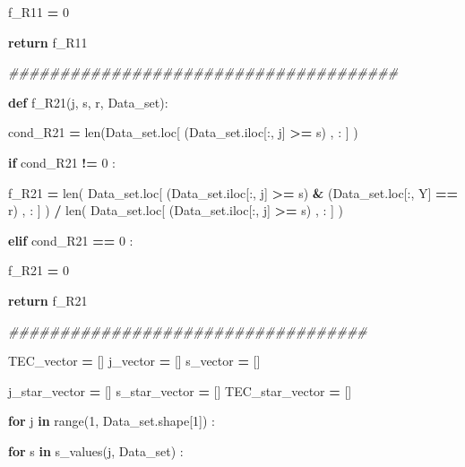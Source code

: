 \documentclass[
  11pt,
  a4paper,
]{article}
\newenvironment{Shaded}{\begin{snugshade}}{\end{snugshade}}
\newcommand{\BuiltInTok}[1]{#1}
\newcommand{\CommentTok}[1]{\textcolor[rgb]{0.56,0.35,0.01}{\textit{#1}}}
\newcommand{\ControlFlowTok}[1]{\textcolor[rgb]{0.13,0.29,0.53}{\textbf{#1}}}
\newcommand{\DecValTok}[1]{\textcolor[rgb]{0.00,0.00,0.81}{#1}}
\newcommand{\KeywordTok}[1]{\textcolor[rgb]{0.13,0.29,0.53}{\textbf{#1}}}
\newcommand{\NormalTok}[1]{#1}
\newcommand{\OperatorTok}[1]{\textcolor[rgb]{0.81,0.36,0.00}{\textbf{#1}}}
\newcommand{\StringTok}[1]{\textcolor[rgb]{0.31,0.60,0.02}{#1}}
\begin{document}
\begin{Shaded}
\begin{Highlighting}[]
\NormalTok{                f\_R11 }\OperatorTok{=} \DecValTok{0}

            
            \ControlFlowTok{return}\NormalTok{ f\_R11 }

        \CommentTok{\#\#\#\#\#\#\#\#\#\#\#\#\#\#\#\#\#\#\#\#\#\#\#\#\#\#\#\#\#\#\#\#\#\#\#\#\#\#}

        \KeywordTok{def}\NormalTok{ f\_R21(j, s, r, Data\_set):}

\NormalTok{            cond\_R21 }\OperatorTok{=} \BuiltInTok{len}\NormalTok{(Data\_set.loc[ (Data\_set.iloc[:, j] }\OperatorTok{\textgreater{}=}\NormalTok{ s) , : ] )}

            \ControlFlowTok{if}\NormalTok{ cond\_R21 }\OperatorTok{!=} \DecValTok{0}\NormalTok{ :}

\NormalTok{                f\_R21 }\OperatorTok{=} \BuiltInTok{len}\NormalTok{( Data\_set.loc[ (Data\_set.iloc[:, j] }\OperatorTok{\textgreater{}=}\NormalTok{ s) }\OperatorTok{\&}\NormalTok{ (Data\_set.loc[:, }\StringTok{\textquotesingle{}Y\textquotesingle{}}\NormalTok{] }\OperatorTok{==}\NormalTok{ r) , : ] ) }\OperatorTok{/} \BuiltInTok{len}\NormalTok{( Data\_set.loc[ (Data\_set.iloc[:, j] }\OperatorTok{\textgreater{}=}\NormalTok{ s) , : ] )}
            
            \ControlFlowTok{elif}\NormalTok{ cond\_R21 }\OperatorTok{==} \DecValTok{0}\NormalTok{ :}

\NormalTok{                f\_R21 }\OperatorTok{=} \DecValTok{0}

            
            \ControlFlowTok{return}\NormalTok{ f\_R21 }


        \CommentTok{\#\#\#\#\#\#\#\#\#\#\#\#\#\#\#\#\#\#\#\#\#\#\#\#\#\#\#\#\#\#\#\#\#\#\#}

\NormalTok{        TEC\_vector }\OperatorTok{=}\NormalTok{ []}
\NormalTok{        j\_vector }\OperatorTok{=}\NormalTok{ []}
\NormalTok{        s\_vector }\OperatorTok{=}\NormalTok{ []}

\NormalTok{        j\_star\_vector }\OperatorTok{=}\NormalTok{ []}
\NormalTok{        s\_star\_vector }\OperatorTok{=}\NormalTok{ []}
\NormalTok{        TEC\_star\_vector }\OperatorTok{=}\NormalTok{ []}

        \ControlFlowTok{for}\NormalTok{ j }\KeywordTok{in} \BuiltInTok{range}\NormalTok{(}\DecValTok{1}\NormalTok{, Data\_set.shape[}\DecValTok{1}\NormalTok{]) :}

            \ControlFlowTok{for}\NormalTok{ s }\KeywordTok{in}\NormalTok{ s\_values(j, Data\_set) :}


\end{Highlighting}
\end{Shaded}
\end{document}
